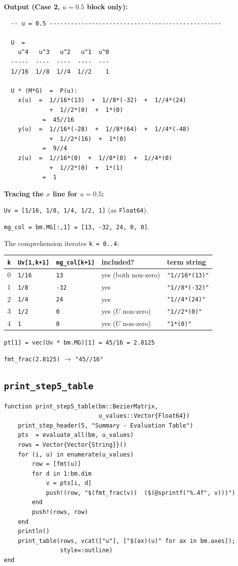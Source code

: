 \documentclass[12pt, a4paper]{article}
\newcommand{\cd}[1]{\texttt{#1}}
\begin{document}
\textbf{Output (Case 2, $u = 0.5$ block only):}
\begin{verbatim}
  -- u = 0.5 -------------------------------------------------

  U  =
    u^4   u^3   u^2   u^1  u^0
  -----  ----  ----  ----  ---
  1//16  1//8  1//4  1//2    1

  U * (M*G)  =  P(u):
    x(u)  =  1//16*(13)  +  1//8*(-32)  +  1//4*(24)
             +  1//2*(0)  +  1*(0)
           =  45//16
    y(u)  =  1//16*(-28)  +  1//8*(64)  +  1//4*(-48)
             +  1//2*(16)  +  1*(0)
           =  9//4
    z(u)  =  1//16*(0)  +  1//8*(0)  +  1//4*(0)
             +  1//2*(0)  +  1*(1)
           =  1
\end{verbatim}

\begin{examplebox}
\textbf{Tracing the $x$ line for $u = 0.5$:}

\cd{Uv = [1/16, 1/8, 1/4, 1/2, 1]} (as \cd{Float64}).

\cd{mg\_col = bm.MG[:,1] = [13, -32, 24, 0, 0]}.

The comprehension iterates \cd{k = 0..4}:

\medskip
\begin{tabular}{lllll}
\toprule
\cd{k} & \cd{Uv[1,k+1]} & \cd{mg\_col[k+1]} & included? & term string \\
\midrule
0 & \cd{1/16} & \cd{13}  & yes (both non-zero) & \cd{"1//16*(13)"} \\
1 & \cd{1/8}  & \cd{-32} & yes & \cd{"1//8*(-32)"} \\
2 & \cd{1/4}  & \cd{24}  & yes & \cd{"1//4*(24)"} \\
3 & \cd{1/2}  & \cd{0}   & yes ($U$ non-zero) & \cd{"1//2*(0)"} \\
4 & \cd{1}    & \cd{0}   & yes ($U$ non-zero) & \cd{"1*(0)"} \\
\bottomrule
\end{tabular}

\medskip
\cd{pt[1] = vec(Uv * bm.MG)[1] = 45/16 = 2.8125}

\cd{fmt\_frac(2.8125)} $\to$ \cd{"45//16"}
\end{examplebox}

\subsection{\texttt{print\_step5\_table}}

\begin{verbatim}
function print_step5_table(bm::BezierMatrix,
                           u_values::Vector{Float64})
    print_step_header(5, "Summary - Evaluation Table")
    pts  = evaluate_all(bm, u_values)
    rows = Vector{Vector{String}}()
    for (i, u) in enumerate(u_values)
        row = [fmt(u)]
        for d in 1:bm.dim
            v = pts[i, d]
            push!(row, "$(fmt_frac(v))  ($(@sprintf("%.4f", v)))")
        end
        push!(rows, row)
    end
    println()
    print_table(rows, vcat(["u"], ["$(ax)(u)" for ax in bm.axes]);
                style=:outline)
end
\end{verbatim}
\end{document}
